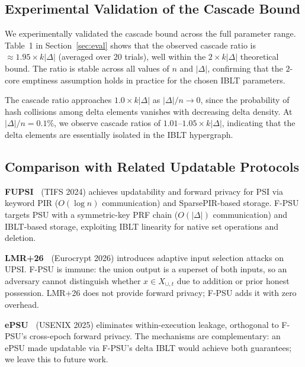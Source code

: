 \documentclass[letterpaper,twocolumn,10pt]{article}
\theoremstyle{definition}
\begin{document}
\subsection{Experimental Validation of the Cascade Bound}

We experimentally validated the cascade bound across the full parameter
range. Table~1 in Section~\ref{sec:eval} shows that the
observed cascade ratio is $\approx 1.95 \times k|\Delta|$ (averaged over
20 trials), well within the $2 \times k|\Delta|$ theoretical bound. The
ratio is stable across all values of $n$ and $|\Delta|$, confirming that
the $2$-core emptiness assumption holds in practice for the chosen IBLT
parameters.

The cascade ratio approaches $1.0 \times k|\Delta|$ as $|\Delta|/n \to
0$, since the probability of hash collisions among delta elements
vanishes with decreasing delta density. At $|\Delta|/n = 0.1\%$, we
observe cascade ratios of $1.01$--$1.05 \times k|\Delta|$, indicating
that the delta elements are essentially isolated in the IBLT hypergraph.

\subsection{Comparison with Related Updatable Protocols}
\label{sec:comparison-detail}

\textbf{FUPSI~\cite{WZC+24}} (TIFS 2024) achieves updatability and forward
privacy for PSI via keyword PIR ($O(\log n)$ communication) and
SparsePIR-based storage. F-PSU targets PSU with a symmetric-key PRF chain
($O(|\Delta|)$ communication) and IBLT-based storage, exploiting IBLT
linearity for native set operations and deletion.

\textbf{LMR+26~\cite{LMR+26}} (Eurocrypt 2026) introduces adaptive input
selection attacks on UPSI. F-PSU is immune: the union output is a superset
of both inputs, so an adversary cannot distinguish whether $x \in
X_{\cup,t}$ due to addition or prior honest possession. LMR+26 does not
provide forward privacy; F-PSU adds it with zero overhead.

\textbf{ePSU~\cite{Tu+25,LBL25}} (USENIX 2025) eliminates within-execution
leakage, orthogonal to F-PSU's cross-epoch forward privacy. The mechanisms
are complementary: an ePSU made updatable via F-PSU's delta IBLT would
achieve both guarantees; we leave this to future work.

\end{document}
